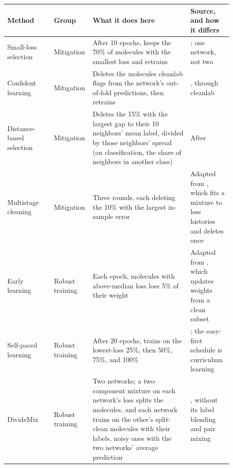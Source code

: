 \begin{table}[htbp]
\centering
\small
\begin{adjustbox}{max width=\textwidth,max totalheight=0.85\textheight}
\begin{tabular}{@{}P{0.20\linewidth}P{0.12\linewidth}P{0.42\linewidth}P{0.18\linewidth}@{}}
\toprule
Method & Group & What it does here & Source, and how it differs \\
\midrule
Small-loss selection & Mitigation & After 10 epochs, keeps the 70\% of molecules with the smallest loss and retrains & \citet{Han2018}; one network, not two \\
Confident learning & Mitigation & Deletes the molecules cleanlab flags from the network's out-of-fold predictions, then retrains & \citet{Northcutt2021}, through cleanlab \\
Distance-based selection & Mitigation & Deletes the 15\% with the largest gap to their 10 neighbors' mean label, divided by those neighbors' spread (on classification, the share of neighbors in another class) & After \citet{Wilson1972} \\
Multistage cleaning & Mitigation & Three rounds, each deleting the 10\% with the largest in-sample error & Adapted from \citet{zhao2025}, which fits a mixture to loss histories and deletes once \\
Early learning & Robust training & Each epoch, molecules with above-median loss lose 5\% of their weight & Adapted from \citet{zhang2025}, which updates weights from a clean subset \\
Self-paced learning & Robust training & After 20 epochs, trains on the lowest-loss 25\%, then 50\%, 75\%, and 100\% & \citet{kumar2010selfpaced}; the easy-first schedule is curriculum learning \citep{Bengio2009} \\
DivideMix & Robust training & Two networks; a two-component mixture on each network's loss splits the molecules, and each network trains on the other's split: clean molecules with their labels, noisy ones with the two networks' average prediction & \citet{li2020dividemix}, without its label blending and pair mixing \\

\end{tabular}
\end{adjustbox}
\end{table}
